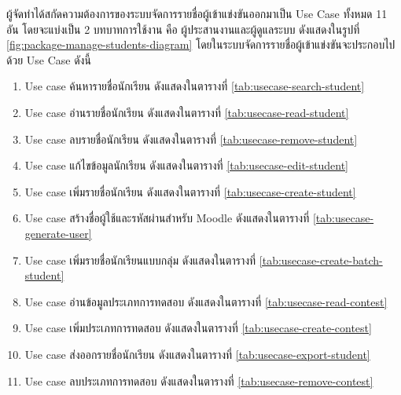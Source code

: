 ผู้จัดทำได้สกัดความต้องการของระบบจัดการรายชื่อผู้เข้าแข่งขันออกมาเป็น Use Case ทั้งหมด 11 อัน โดยจะแบ่งเป็น 2 บทบาทการใช้งาน คือ ผู้ประสานงานและผู้ดูแลระบบ ดังแสดงในรูปที่ \ref{fig:package-manage-students-diagram}
โดยในระบบจัดการรายชื่อผู้เข้าแข่งขันจะประกอบไปด้วย Use Case ดังนี้
\begin{enumerate}
    \item Use case ค้นหารายชื่อนักเรียน ดังแสดงในตารางที่ \ref{tab:usecase-search-student}
    \item Use case อ่านรายชื่อนักเรียน ดังแสดงในตารางที่ \ref{tab:usecase-read-student}
    \item Use case ลบรายชื่อนักเรียน ดังแสดงในตารางที่ \ref{tab:usecase-remove-student}
    \item Use case แก้ไขข้อมูลนักเรียน ดังแสดงในตารางที่ \ref{tab:usecase-edit-student}
    \item Use case เพิ่มรายชื่อนักเรียน ดังแสดงในตารางที่ \ref{tab:usecase-create-student}
    \item Use case สร้างชื่อผู้ใช้และรหัสผ่านสำหรับ Moodle ดังแสดงในตารางที่ \ref{tab:usecase-generate-user}
    \item Use case เพิ่มรายชื่อนักเรียนแบบกลุ่ม ดังแสดงในตารางที่ \ref{tab:usecase-create-batch-student}
    \item Use case อ่านข้อมูลประเภทการทดสอบ ดังแสดงในตารางที่ \ref{tab:usecase-read-contest}
    \item Use case เพิ่มประเภทการทดสอบ ดังแสดงในตารางที่ \ref{tab:usecase-create-contest}
    \item Use case ส่งออกรายชื่อนักเรียน ดังแสดงในตารางที่ \ref{tab:usecase-export-student}
    \item Use case ลบประเภทการทดสอบ ดังแสดงในตารางที่ \ref{tab:usecase-remove-contest}
\end{enumerate}

